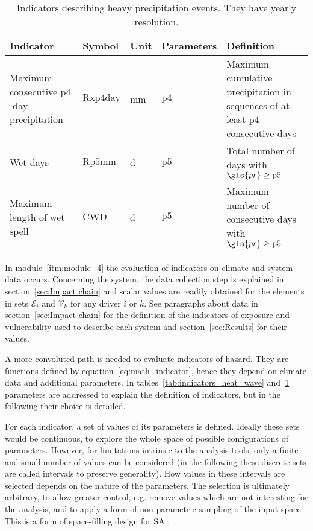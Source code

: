 \begin{table}
  \centering
  \caption{Indicators describing heavy precipitation events. They have yearly resolution.}
  \label{tab:indicators_heavy_precipitation}
  \begin{tabular}{p{}lllp{}}
    Indicator                                           & Symbol             & Unit                & Parameters    & Definition                                                                               \\
    \hline
    Maximum consecutive $\mathrm{p4}$-day precipitation & $\mathrm{Rxp4day}$ & \unit{\milli\metre} & $\mathrm{p4}$ & Maximum cumulative precipitation in sequences of at least $\mathrm{p4}$ consecutive days \\
    Wet days                                            & $\mathrm{Rp5mm}$   & \unit{\day}         & $\mathrm{p5}$ & Total number of days with $\gls{pr} \geq \mathrm{p5}$                                    \\
    Maximum length of wet spell                         & $\mathrm{CWD}$     & \unit{\day}         & $\mathrm{p5}$ & Maximum number of consecutive days with $\gls{pr} \geq \mathrm{p5}$                      \\
  \end{tabular}
\end{table}

In module~\ref{itm:module_4} the evaluation of \glspl{indicator} on climate and system data occurs. Concerning the system, the data collection step is explained in section~\ref{sec:Impact chain} and scalar values are readily obtained for the elements in sets $\mathcal{E}_i$ and $\mathcal{V}_k$ for any \gls{driver} $i$ or $k$. See paragraphs about data in section~\ref{sec:Impact chain} for the definition of the \glspl{indicator} of \gls{exposure} and \gls{vulnerability} used to describe each system and section~\ref{sec:Results} for their values.

A more convoluted path is needed to evaluate \glspl{indicator} of \gls{hazard}. They are functions defined by equation~\eqref{eq:math_indicator}, hence they depend on climate data and additional parameters. In tables~\ref{tab:indicators_heat_wave} and~\ref{tab:indicators_heavy_precipitation} parameters are addressed to explain the definition of indicators, but in the following their choice is detailed.

For each \gls{indicator}, a set of values of its parameters is defined. Ideally these sets would be continuous, to explore the whole space of possible configurations of parameters. However, for limitations intrinsic to the analysis tools, only a finite and small number of values can be considered (in the following these discrete sets are called intervals to preserve generality).
How values in these intervals are selected depends on the nature of the parameters. The selection is ultimately arbitrary, to allow greater control, e.g. remove values which are not interesting for the analysis, and to apply a form of non-parametric sampling of the input space. This is a form of space-filling design for \gls{SA} \cite[593-594]{2015DeanHandbookOf}.

